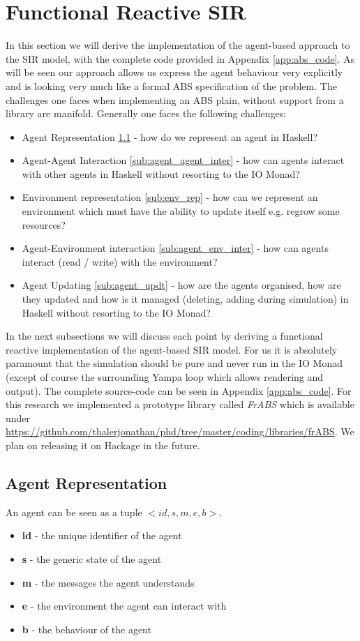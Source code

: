 \section{Functional Reactive SIR}
In this section we will derive the implementation of the agent-based approach to the SIR model, with the complete code provided in Appendix \ref{app:abs_code}. As will be seen our approach allows us express the agent behaviour very explicitly and is looking very much like a formal ABS specification of the problem. The challenges one faces when implementing an ABS plain, without support from a library are manifold. Generally one faces the following challenges:

\begin{itemize}
	\item Agent Representation \ref{sub:agent_rep} - how do we represent an agent in Haskell?
	\item Agent-Agent Interaction \ref{sub:agent_agent_inter} - how can agents interact with other agents in Haskell without resorting to the IO Monad?
	\item Environment representation \ref{sub:env_rep} - how can we represent an environment which must have the ability to update itself e.g. regrow some resources?
	\item Agent-Environment interaction \ref{sub:agent_env_inter} - how can agents interact (read / write) with the environment?
	\item Agent Updating \ref{sub:agent_updt} - how are the agents organised, how are they updated and how is it managed (deleting, adding during simulation) in Haskell without resorting to the IO Monad?
\end{itemize}

In the next subsections we will discuss each point by deriving a functional reactive implementation of the agent-based SIR model. For us it is absolutely paramount that the simulation should be pure and never run in the IO Monad (except of course the surrounding Yampa loop which allows rendering and output). The complete source-code can be seen in Appendix \ref{app:abs_code}. For this research we implemented a prototype library called \textit{FrABS} which is available under \url{https://github.com/thalerjonathan/phd/tree/master/coding/libraries/frABS}. We plan on releasing it on Hackage in the future.

\subsection{Agent Representation}
\label{sub:agent_rep}
An agent can be seen as a tuple $<id, s, m, e, b>$.
\begin{itemize}
	\item \textbf{id} - the unique identifier of the agent
	\item \textbf{s} - the generic state of the agent
	\item \textbf{m} - the messages the agent understands
	\item \textbf{e} - the environment the agent can interact with
	\item \textbf{b} - the behaviour of the agent
\end{itemize}

